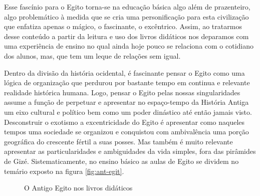 \begin{refsection}
    Esse fascínio para o Egito torna-se na educação básica algo além de prazenteiro, algo problemático à medida que se cria uma personificação para esta civilização que enfatiza apenas o mágico, o fascinante, o excêntrico. Assim, ao tratarmos desse conteúdo a partir da leitura e uso dos livros didáticos nos deparamos com uma experiência de ensino no qual ainda hoje pouco se relaciona com o cotidiano dos alunos, mas, que tem um leque de relações sem igual.  

    Dentro da divisão da história ocidental, é fascinante pensar o Egito como uma lógica de organização que perdurou por bastante tempo em continua e relevante realidade histórica humana. Logo, pensar o Egito pelas nossas singularidades assume a função de perpetuar e apresentar no espaço-tempo da História Antiga um eixo cultural e político bem como um poder dinástico até então jamais visto. Desconstruir o exotismo a excentricidade do Egito é apresentar como naqueles tempos uma sociedade se organizou e conquistou com ambivalência uma porção geográfica do crescente fértil a suas posses. Mas também é muito relevante apresentar as particularidades e ambiguidades da vida simples, fora das pirâmides de Gizé. Sistematicamente, no ensino básico as aulas de Egito se dividem no temário exposto na figura \ref{fig:ant-egit}.

    \begin{figure}[ht]%
        \centering%
        \caption{O Antigo Egito nos livros didáticos}%
\end{figure}
\end{refsection}
